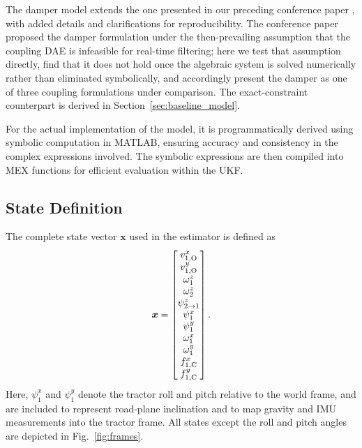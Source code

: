 \documentclass[conference]{IEEEtran}
\begin{document}
The damper model extends the one presented in our preceding conference paper \cite{ceder_bayesian_2025}, with added details and clarifications for reproducibility. The conference paper proposed the damper formulation under the then-prevailing assumption that the coupling DAE is infeasible for real-time filtering; here we test that assumption directly, find that it does not hold once the algebraic system is solved numerically rather than eliminated symbolically, and accordingly present the damper as one of three coupling formulations under comparison. The exact-constraint counterpart is derived in Section~\ref{sec:baseline_model}.


For the actual implementation of the model, it is programmatically derived using symbolic computation in MATLAB, ensuring accuracy and consistency in the complex expressions involved. The symbolic expressions are then compiled into MEX functions for efficient evaluation within the UKF.
\subsection{State Definition}
The complete state vector $\bm x$ used in the estimator is defined as
\begin{equation}
\bm x = \begin{bmatrix}
    v^x_{1,\text{O}} \\
    v^y_{1,\text{O}} \\ 
    \omega^z_1 \\
    \omega^z_2 \\ 
    \psi^z_{2\to 1} \\
    \psi^x_1 \\
    \psi^y_1 \\
    \omega^x_1 \\
    \omega^y_1 \\
    f_{1,\text{C}}^x \\
    f_{1,\text{C}}^y \\
\end{bmatrix}. \label{eq:stateVector}
\end{equation}
Here, $\psi^x_1$ and $\psi^y_1$ denote the tractor roll and pitch relative to the world frame, and are included to represent road-plane inclination and to map gravity and IMU measurements into the tractor frame. All states except the roll and pitch angles are depicted in Fig.~\ref{fig:frames}. 
\end{document}
